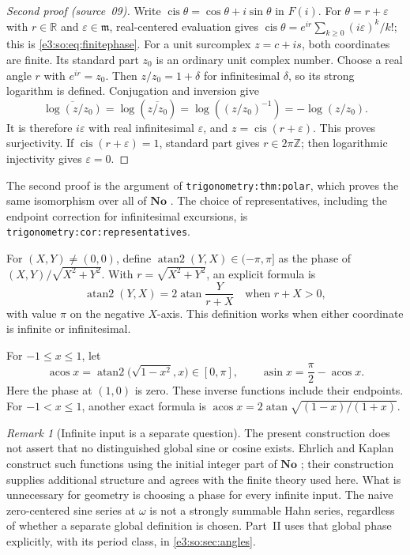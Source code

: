 \documentclass[11pt,letterpaper]{article}
\numberwithin{equation}{section}
\theoremstyle{definition}
\theoremstyle{remark}
\newtheorem{remark}[remark]{Remark}
\newcommand{\No}{\mathbf{No}}
\newcommand{\R}{\mathbb R}
\newcommand{\Z}{\mathbb Z}
\newcommand{\mm}{\mathfrak m}
\newcommand{\eps}{\varepsilon}
\newcommand{\cis}{\operatorname{cis}}
\newcommand{\atan}{\operatorname{atan}}
\newcommand{\atantwo}{\operatorname{atan2}}
\newcommand{\acos}{\operatorname{acos}}
\newcommand{\asin}{\operatorname{asin}}
\begin{document}
\begin{proof}[Second proof (source~09)]
Write $\cis\theta=\cos\theta+i\sin\theta$ in $F(i)$. For $\theta=r+\eps$ with
$r\in\R$ and $\eps\in\mm$, real-centered evaluation gives
$\cis\theta=e^{ir}\sum_{k\ge0}(i\eps)^k/k!$; this is \cref{e3:so:eq:finitephase}.
For a unit surcomplex $z=c+is$, both coordinates are finite. Its standard
part $z_0$ is an ordinary unit complex number. Choose a real angle $r$ with
$e^{ir}=z_0$. Then $z/z_0=1+\delta$ for infinitesimal $\delta$, so its
strong logarithm is defined. Conjugation and inversion give
\[
 \overline{\log(z/z_0)}=\log(\overline{z/z_0})
 =\log((z/z_0)^{-1})=-\log(z/z_0).
\]
It is therefore $i\eps$ with real infinitesimal $\eps$, and $z=\cis(r+\eps)$.
This proves surjectivity. If $\cis(r+\eps)=1$, standard part gives
$r\in2\pi\Z$; then logarithmic injectivity gives $\eps=0$.
\end{proof}

The second proof is the argument of \texttt{trigonometry:thm:polar}, which proves
the same isomorphism over all of $\No$ \cite{RepoTrig}. The choice of
representatives, including the endpoint correction for infinitesimal
excursions, is \texttt{trigonometry:cor:representatives}.

For $(X,Y)\ne(0,0)$, define $\atantwo(Y,X)\in(-\pi,\pi]$ as the phase
of $(X,Y)/\sqrt{X^2+Y^2}$. With $r=\sqrt{X^2+Y^2}$, an explicit formula is
\begin{equation}\label{e3:eq:atan2}
 \atantwo(Y,X)=2\atan\frac{Y}{r+X}
 \quad\text{when }r+X>0,
\end{equation}
with value $\pi$ on the negative $X$-axis. This definition works when either
coordinate is infinite or infinitesimal.

For $-1\le x\le1$, let
\begin{equation}\label{e3:eq:acos}
 \acos x=\atantwo\bigl(\sqrt{1-x^2},x\bigr)\in[0,\pi],\qquad
 \asin x=\frac\pi2-\acos x.
\end{equation}
Here the phase at $(1,0)$ is zero. These inverse functions include their
endpoints. For $-1<x\le1$, another exact formula is
$\acos x=2\atan\sqrt{(1-x)/(1+x)}$.

\begin{remark}[Infinite input is a separate question]\label{e3:rem:infinite-input}
The present construction does not assert that no distinguished global sine
or cosine exists. Ehrlich and Kaplan construct such functions using the
initial integer part of $\No$ \cite[\S11]{EK}; their construction supplies
additional structure and agrees with the finite theory used here. What is
unnecessary for geometry is choosing a phase for every infinite input.
The naive zero-centered sine series at $\omega$ is not a strongly summable
Hahn series, regardless of whether a separate global definition is chosen.
Part~II uses that global phase explicitly, with its period class, in
\cref{e3:so:sec:angles}.
\end{remark}
\end{document}
